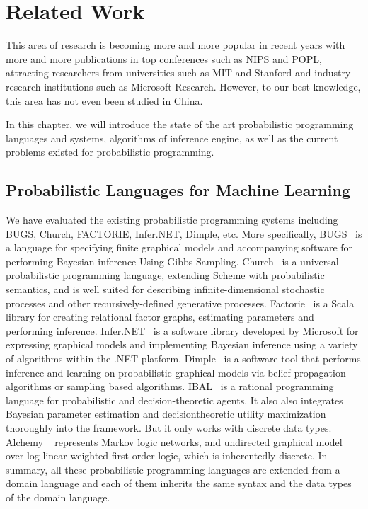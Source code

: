 \chapter{Related Work}
\label{chap:related}
This area of research is becoming more and more popular in recent years with more and more publications in top conferences such as NIPS and POPL, attracting researchers from universities such as MIT and Stanford and industry research institutions such as Microsoft Research. However, to our best knowledge, this area has not even been studied in China. 

In this chapter, we will introduce the state of the art probabilistic programming languages and systems, algorithms of inference engine, as well as the current problems existed for probabilistic programming.

\section{Probabilistic Languages for Machine Learning}
We have evaluated the existing probabilistic programming systems including BUGS, Church, FACTORIE, Infer.NET, Dimple, etc. More specifically, BUGS~\cite{bugs} is a language for specifying finite graphical models and accompanying software for performing Bayesian inference Using Gibbs Sampling. Church~\cite{church} is a universal probabilistic programming language, extending Scheme with probabilistic semantics, and is well suited for describing infinite-dimensional stochastic processes and other recursively-defined generative processes. Factorie~\cite{factorie} is a Scala library for creating relational factor graphs, estimating parameters and performing inference. Infer.NET~\cite{infernet} is a software library developed by Microsoft for expressing graphical models and implementing Bayesian inference using a variety of algorithms within the .NET platform. Dimple~\cite{dimple} is a software tool that performs inference and learning on probabilistic graphical models via belief propagation algorithms or sampling based algorithms. IBAL~\cite{ibal} is a rational programming language for probabilistic and decision-theoretic agents. It also also integrates Bayesian parameter estimation and decisiontheoretic utility maximization thoroughly into the framework. But it only works with discrete data types. Alchemy ~\cite{alchemy} represents Markov logic networks, and undirected graphical model over log-linear-weighted first order logic, which is inherentedly discrete. In summary, all these probabilistic programming languages are extended from a domain language and each of them inherits the same syntax and the data types of the domain language.


